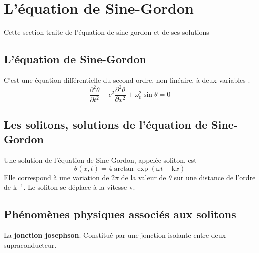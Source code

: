 %
\section{L'équation de Sine-Gordon}
%
Cette section traite de l'équation de sine-gordon et de ses solutions
\subsection{L'équation de Sine-Gordon}
\label{belmont}
C'est une équation différentielle du second ordre, non linéaire, à deux variables \cite{sine-gordon}.
\[
\frac{\partial^2\theta}{\partial t^2} - c^2 \frac{\partial^2\theta}{\partial x^2} + \omega _0 ^2 \sin \theta = 0
\]
%
%
%
\subsection{Les solitons, solutions de l'équation de Sine-Gordon}
Une solution de l'équation de Sine-Gordon, appelée soliton, est 
\[
\theta(x,t)=4\arctan \exp ( \omega t - \text{k} x )
\]
Elle correspond à une variation de 2$\pi$ de la valeur de $\theta$ sur une distance de l'ordre de k$^{-1}$. Le soliton se déplace à la vitesse v.
\subsection{Phénomènes physiques associés aux solitons}
La {\bf jonction josephson}. Constitué par une jonction isolante entre deux supraconducteur.

